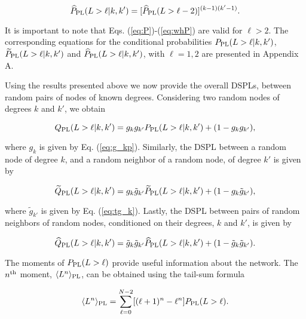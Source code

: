 \documentclass[preprint,pre,superscriptaddress,showpacs]{revtex4}
\begin{document}
\begin{equation}
\widehat P_{\rm PL}(L > \ell | k,k') 
= 
[ \widehat P_{\rm PL}(L>\ell-2)]^{(k-1) (k'-1)}.
\label{eq:whP}
\end{equation}

\noindent
It is important to note that
Eqs. (\ref{eq:P})-(\ref{eq:whP})
are valid for $\ell>2$.
The corresponding equations for the conditional
probabilities 
$P_{\rm PL}(L > \ell | k,k')$,
$\widetilde P_{\rm PL}(L > \ell | k,k')$
and
$\widehat P_{\rm PL}(L > \ell | k,k')$,
with $\ell=1,2$
are presented in Appendix A.

Using the results presented above we now provide the overall DSPLs, 
between random pairs of nodes of
known degrees. Considering two random nodes 
of degrees $k$ and $k'$, we obtain

\begin{equation}
Q_{\rm PL}(L>\ell | k,k') = g_{k} g_{k'} 
P_{\rm PL}(L>\ell | k,k') 
+ (1 - g_{k} g_{k'}),
\label{eq:Q2}
\end{equation}

\noindent
where $g_k$ is  given by 
Eq. (\ref{eq:g_kp}).
Similarly, the DSPL between a random node 
of degree $k$, and a random neighbor of a random 
node, of degree $k'$ is given by


\begin{equation}
\widetilde Q_{\rm PL}(L>\ell | k,k') = g_k {\tilde g}_{k'} 
\widetilde P_{\rm PL}(L>\ell | k, k') + (1 - g_{k} {\tilde g}_{k'}),
\label{eq:Qtc}
\end{equation}

\noindent
where $\tilde g_{k'}$ is 
given by Eq. (\ref{eq:tg_k}).
Lastly, the DSPL between pairs of random neighbors of random nodes,
conditioned on their degrees, $k$ and $k'$,
is given by

\begin{equation}
\widehat Q_{\rm PL}(L>\ell | k, k') = {\tilde g}_{k} {\tilde g}_{k'} 
\widehat P_{\rm PL}(L>\ell | k, k') + (1 - \tilde g_{k} \tilde g_{k'}).
\label{eq:Qhc}
\end{equation}

\noindent
The moments of
$P_{\rm PL}(L>\ell)$
provide useful information about the network.
The $n^{\rm th}$ moment, 
$\langle L^n \rangle_{\rm PL}$,
can be obtained 
using the tail-sum formula
\cite{Pitman1993}

\begin{equation}
\langle L^n \rangle_{\rm PL} = 
\sum_{\ell=0}^{N-2} [(\ell+1)^n - \ell^n] P_{\rm PL}(L>\ell).
\label{eq:tail_sum}
\end{equation}
\end{document}
